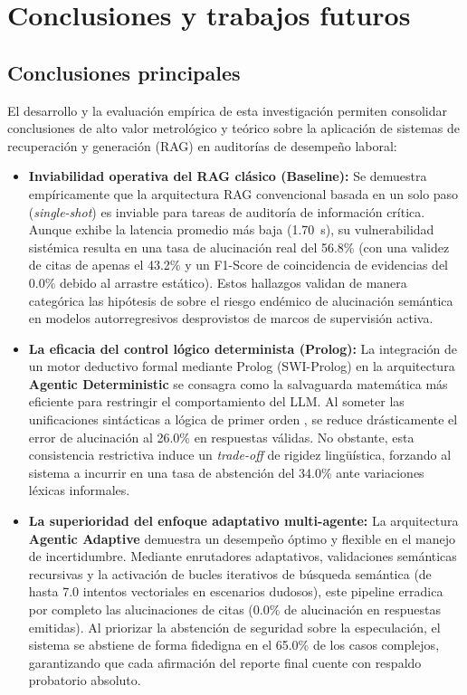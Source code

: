 \chapter{Conclusiones y trabajos futuros}
\label{ch:conclusiones_trabajos_futuros}

\section{Conclusiones principales}
\label{sec:conclusiones_principales}
El desarrollo y la evaluación empírica de esta investigación permiten consolidar conclusiones de alto valor metrológico y teórico sobre la aplicación de sistemas de recuperación y generación (RAG) en auditorías de desempeño laboral:

\begin{itemize}
    \item \textbf{Inviabilidad operativa del RAG clásico (Baseline):} Se demuestra empíricamente que la arquitectura RAG convencional basada en un solo paso (\textit{single-shot}) \cite{lewis2020rag} es inviable para tareas de auditoría de información crítica. Aunque exhibe la latencia promedio más baja (1.70~s), su vulnerabilidad sistémica resulta en una tasa de alucinación real del 56.8\% (con una validez de citas de apenas el 43.2\% y un F1-Score de coincidencia de evidencias del 0.0\% debido al arrastre estático). Estos hallazgos validan de manera categórica las hipótesis de \cite{ji2023survey} sobre el riesgo endémico de alucinación semántica en modelos autorregresivos desprovistos de marcos de supervisión activa.

    \item \textbf{La eficacia del control lógico determinista (Prolog):} La integración de un motor deductivo formal mediante Prolog (SWI-Prolog) \cite{wielemaker2012swi, clocksin2003programming} en la arquitectura \textbf{Agentic Deterministic} se consagra como la salvaguarda matemática más eficiente para restringir el comportamiento del LLM. Al someter las unificaciones sintácticas a lógica de primer orden \cite{lloyd1987foundations}, se reduce drásticamente el error de alucinación al 26.0\% en respuestas válidas. No obstante, esta consistencia restrictiva induce un \textit{trade-off} de rigidez lingüística, forzando al sistema a incurrir en una tasa de abstención del 34.0\% ante variaciones léxicas informales.

    \item \textbf{La superioridad del enfoque adaptativo multi-agente:} La arquitectura \textbf{Agentic Adaptive} demuestra un desempeño óptimo y flexible en el manejo de incertidumbre. Mediante enrutadores adaptativos, validaciones semánticas recursivas \cite{dong2025rag} y la activación de bucles iterativos de búsqueda semántica (de hasta 7.0 intentos vectoriales en escenarios dudosos), este pipeline erradica por completo las alucinaciones de citas (0.0\% de alucinación en respuestas emitidas). Al priorizar la abstención de seguridad sobre la especulación, el sistema se abstiene de forma fidedigna en el 65.0\% de los casos complejos, garantizando que cada afirmación del reporte final cuente con respaldo probatorio absoluto.
\end{itemize}

